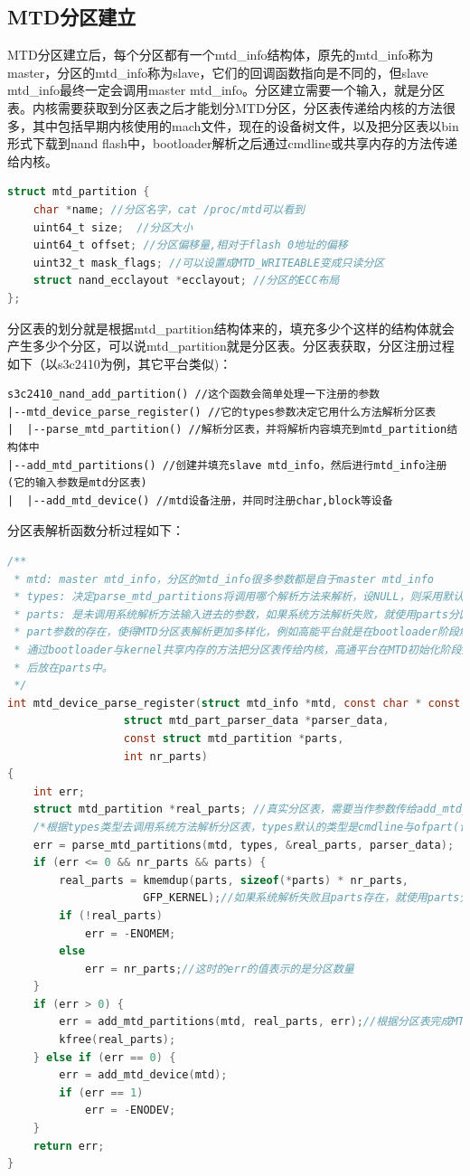 \subsection{MTD分区建立}
MTD分区建立后，每个分区都有一个mtd\_info结构体，原先的mtd\_info称为master，分区的mtd\_info称为slave，它们的回调函数指向是不同的，但slave mtd\_info最终一定会调用master mtd\_info。分区建立需要一个输入，就是分区表。内核需要获取到分区表之后才能划分MTD分区，分区表传递给内核的方法很多，其中包括早期内核使用的mach文件，现在的设备树文件，以及把分区表以bin形式下载到nand flash中，bootloader解析之后通过cmdline或共享内存的方法传递给内核。
\begin{lstlisting}[language=C]
struct mtd_partition {
	char *name; //分区名字，cat /proc/mtd可以看到
	uint64_t size;	//分区大小
	uint64_t offset; //分区偏移量,相对于flash 0地址的偏移
	uint32_t mask_flags; //可以设置成MTD_WRITEABLE变成只读分区
	struct nand_ecclayout *ecclayout; //分区的ECC布局
};
\end{lstlisting}
分区表的划分就是根据mtd\_partition结构体来的，填充多少个这样的结构体就会产生多少个分区，可以说mtd\_partition就是分区表。分区表获取，分区注册过程如下（以s3c2410为例，其它平台类似)：
\begin{mdframed}[style=leftredline]
\begin{verbatim}
s3c2410_nand_add_partition() //这个函数会简单处理一下注册的参数
|--mtd_device_parse_register() //它的types参数决定它用什么方法解析分区表
|  |--parse_mtd_partition() //解析分区表，并将解析内容填充到mtd_partition结构体中
|--add_mtd_partitions() //创建并填充slave mtd_info，然后进行mtd_info注册(它的输入参数是mtd分区表)
|  |--add_mtd_device() //mtd设备注册，并同时注册char,block等设备
\end{verbatim}
\end{mdframed}
分区表解析函数分析过程如下：
\begin{lstlisting}[language=C]
/**
 * mtd: master mtd_info，分区的mtd_info很多参数都是自于master mtd_info
 * types: 决定parse_mtd_partitions将调用哪个解析方法来解析，设NULL，则采用默认参数
 * parts: 是未调用系统解析方法输入进去的参数，如果系统方法解析失败，就使用parts分区表。
 * part参数的存在，使得MTD分区表解析更加多样化，例如高能平台就是在bootloader阶段解析后
 * 通过bootloader与kernel共享内存的方法把分区表传给内核，高通平台在MTD初始化阶段把它解析
 * 后放在parts中。
 */
int mtd_device_parse_register(struct mtd_info *mtd, const char * const *types,
			      struct mtd_part_parser_data *parser_data,
			      const struct mtd_partition *parts,
			      int nr_parts)
{
	int err;
	struct mtd_partition *real_parts; //真实分区表，需要当作参数传给add_mtd_partitions
	/*根据types类型去调用系统方法解析分区表，types默认的类型是cmdline与ofpart(设备树)*/
	err = parse_mtd_partitions(mtd, types, &real_parts, parser_data);
	if (err <= 0 && nr_parts && parts) {
		real_parts = kmemdup(parts, sizeof(*parts) * nr_parts,
				     GFP_KERNEL);//如果系统解析失败且parts存在，就使用parts分区表
		if (!real_parts)
			err = -ENOMEM;
		else
			err = nr_parts;//这时的err的值表示的是分区数量
	}
	if (err > 0) {
		err = add_mtd_partitions(mtd, real_parts, err);//根据分区表完成MTD分区注册
		kfree(real_parts);
	} else if (err == 0) {
		err = add_mtd_device(mtd);
		if (err == 1)
			err = -ENODEV;
	}
	return err;
}
\end{lstlisting}

